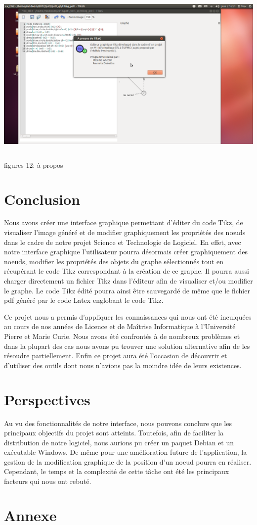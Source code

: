 \documentclass[a4paper]{report}
\begin{document}
  \includegraphics[width=15cm, height=9cm]{img/r7.png}
\\ 
figures 12: à propos
\chapter{Conclusion}
Nous avons créer une interface graphique permettant d'éditer du code Tikz, de visualiser l'image généré et de modifier graphiquement les propriétés des n{\oe}uds dans le cadre de notre projet Science et Technologie de Logiciel. En effet, avec notre interface graphique l'utilisateur pourra désormais créer graphiquement des noeuds, modifier les propriétés des objets du graphe sélectionnés tout en récupérant le code Tikz correspondant à la création de ce graphe. Il pourra aussi charger directement un fichier Tikz dans l'éditeur afin de visualiser et/ou modifier le graphe. Le code Tikz édité pourra ainsi être sauvegardé de même que le fichier pdf généré par le code Latex englobant le code Tikz. 

Ce projet nous a permis d’appliquer les connaissances qui nous ont été inculquées au cours
de nos années de Licence et de Maîtrise Informatique à l’Université Pierre et Marie Curie. Nous avons été confrontés à de nombreux problèmes et dans la plupart des cas nous avons pu trouver une solution alternative afin de les résoudre partiellement.
Enfin ce projet aura été l’occasion de découvrir et d’utiliser des outils dont nous n’avions pas la
moindre idée de leurs existences.



\chapter{Perspectives}
Au vu des fonctionnalités de notre interface, nous pouvons conclure que les principaux objectifs du projet sont atteints. Toutefois, afin de faciliter la distribution de notre logiciel, nous aurions pu créer un paquet Debian et un exécutable Windows. De même pour une amélioration future de l'application, la gestion de la modification graphique de la position d'un noeud pourra en réaliser. Cependant, le temps et la
complexité de cette tâche ont été les principaux facteurs qui nous ont rebuté. 

\chapter{Annexe}

   
\end{document}
